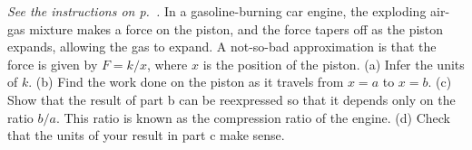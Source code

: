 \emph{See the instructions on p.~\pageref{hw:longbow}.} In a gasoline-burning car engine, the exploding air-gas
mixture makes a force on the piston, and the force tapers off as the piston expands, allowing the
gas to expand.
A not-so-bad approximation is that the force is given by $F=k/x$,
where $x$ is the position of the piston.
(a) Infer the units of $k$.
(b) Find the
work done on the piston as it travels from $x=a$ to $x=b$.
(c) Show that the result of part b can be reexpressed so that it depends only
on the ratio $b/a$. This ratio is known as the compression ratio of the engine.
(d) Check that the units of your result in part c make sense.
\answercheck
